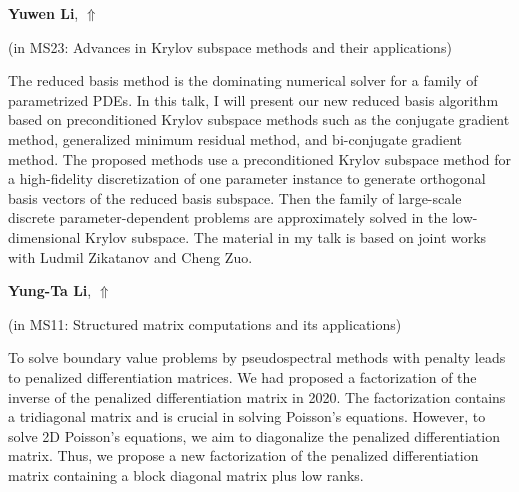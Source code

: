 \documentclass[ILAS2025-program.tex]{subfiles}
\begin{document}
\hypertarget{down0196}{}\begin{ilasabstract}
    
\textbf{Yuwen Li},  \hfill \hyperlink{up0196}{$\Uparrow$}
    
    
(in {\color{mstitle}MS23: Advances in Krylov subspace methods and their applications})
        
\mtskip
    The reduced basis method is the dominating numerical solver for a family of parametrized PDEs. In this talk, I will present our new reduced basis algorithm based on preconditioned Krylov subspace methods such as the conjugate gradient method, generalized minimum residual method, and bi-conjugate gradient method. The proposed methods use a preconditioned Krylov subspace method for a high-fidelity discretization of one parameter instance to generate orthogonal basis vectors of the reduced basis subspace. Then the family of large-scale discrete parameter-dependent problems are approximately solved in the low-dimensional Krylov subspace. The material in my talk is based on joint works with Ludmil Zikatanov and Cheng Zuo.

\end{ilasabstract}
    

\hypertarget{down0235}{}\begin{ilasabstract}
    
\textbf{Yung-Ta Li},  \hfill \hyperlink{up0235}{$\Uparrow$}
    
    
(in {\color{mstitle}MS11: Structured matrix computations and its applications})
        
\mtskip
    To solve boundary value problems by pseudospectral methods with penalty leads to penalized differentiation matrices. 
We had proposed a factorization of the inverse of the penalized differentiation matrix  in 2020. 
The factorization contains a tridiagonal matrix and is  crucial in solving Poisson's equations.  
However, to solve 2D Poisson's equations, we aim to diagonalize the penalized differentiation matrix.
Thus, we propose a new factorization  of the  penalized differentiation matrix containing a block diagonal matrix plus low ranks.
\end{ilasabstract}
    
\end{document}
